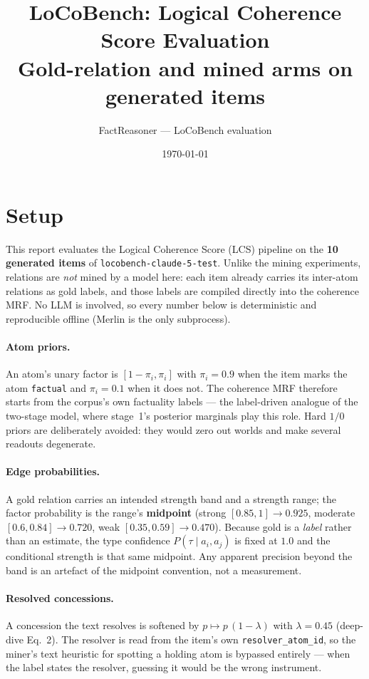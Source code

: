 \documentclass[11pt]{article}
\title{LoCoBench: Logical Coherence Score Evaluation\\
\large Gold-relation and mined arms on generated items}
\author{FactReasoner --- LoCoBench evaluation}
\date{\today}
\begin{document}
\maketitle

\section{Setup}

This report evaluates the Logical Coherence Score (LCS) pipeline on the \textbf{10 generated items} of \texttt{locobench-claude-5-test}. Unlike the mining experiments, relations are \emph{not} mined by a model here: each item already carries its inter-atom relations as gold labels, and those labels are compiled directly into the coherence MRF. No LLM is involved, so every number below is deterministic and reproducible offline (Merlin is the only subprocess).

\paragraph{Atom priors.} An atom's unary factor is $[1-\pi_i, \pi_i]$ with $\pi_i = 0.9$ when the item marks the atom \texttt{factual} and $\pi_i = 0.1$ when it does not. The coherence MRF therefore starts from the corpus's own factuality labels --- the label-driven analogue of the two-stage model, where stage~1's posterior marginals play this role. Hard $1/0$ priors are deliberately avoided: they would zero out worlds and make several readouts degenerate.

\paragraph{Edge probabilities.} A gold relation carries an intended strength band and a strength range; the factor probability is the range's \textbf{midpoint} (strong $[0.85,1] \to 0.925$, moderate $[0.6,0.84] \to 0.720$, weak $[0.35,0.59] \to 0.470$). Because gold is a \emph{label} rather than an estimate, the type confidence $P(\tau \mid a_i,a_j)$ is fixed at $1.0$ and the conditional strength is that same midpoint. Any apparent precision beyond the band is an artefact of the midpoint convention, not a measurement.

\paragraph{Resolved concessions.} A concession the text resolves is softened by $p \mapsto p\,(1-\lambda)$ with $\lambda = 0.45$ (deep-dive Eq.~2). The resolver is read from the item's own \texttt{resolver\_atom\_id}, so the miner's text heuristic for spotting a holding atom is bypassed entirely --- when the label states the resolver, guessing it would be the wrong instrument.
\end{document}
